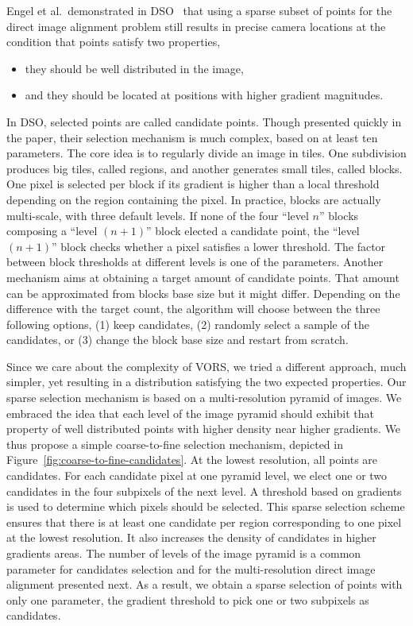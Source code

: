 Engel et al.\ demonstrated in DSO~\cite{engel2017direct} that using a sparse subset
of points for the direct image alignment problem still results in precise camera locations
at the condition that points satisfy two properties,
\begin{itemize}
\setlength\itemsep{-0.5em}
	\item they should be well distributed in the image,
	\item and they should be located at positions with higher gradient magnitudes.
\end{itemize}
In DSO, selected points are called candidate points.
Though presented quickly in the paper,
their selection mechanism is much complex, based on at least ten parameters.
The core idea is to regularly divide an image in tiles.
One subdivision produces big tiles, called regions,
and another generates small tiles, called blocks.
One pixel is selected per block if its gradient is higher than a local threshold
depending on the region containing the pixel.
In practice, blocks are actually multi-scale, with three default levels.
If none of the four ``level $n$'' blocks composing a ``level $(n+1)$'' block elected a candidate point,
the ``level $(n+1)$'' block checks whether a pixel satisfies a lower threshold.
The factor between block thresholds at different levels is one of the parameters.
Another mechanism aims at obtaining a target amount of candidate points.
That amount can be approximated from blocks base size but it might differ.
Depending on the difference with the target count,
the algorithm will choose between the three following options,
(1) keep candidates, (2) randomly select a sample of the candidates,
or (3) change the block base size and restart from scratch.

Since we care about the complexity of VORS,
we tried a different approach, much simpler,
yet resulting in a distribution satisfying the two expected properties.
Our sparse selection mechanism is based on a multi-resolution pyramid of images.
We embraced the idea that each level of the image pyramid should exhibit
that property of well distributed points with higher density near higher gradients.
We thus propose a simple coarse-to-fine selection mechanism,
depicted in Figure~\ref{fig:coarse-to-fine-candidates}.
At the lowest resolution, all points are candidates.
For each candidate pixel at one pyramid level, we elect one or two candidates
in the four subpixels of the next level.
A threshold based on gradients is used to determine which pixels should be selected.
This sparse selection scheme ensures that there is at least one candidate per region
corresponding to one pixel at the lowest resolution.
It also increases the density of candidates in higher gradients areas.
The number of levels of the image pyramid is a common parameter for candidates selection
and for the multi-resolution direct image alignment presented next.
As a result, we obtain a sparse selection of points with only one parameter,
the gradient threshold to pick one or two subpixels as candidates.

